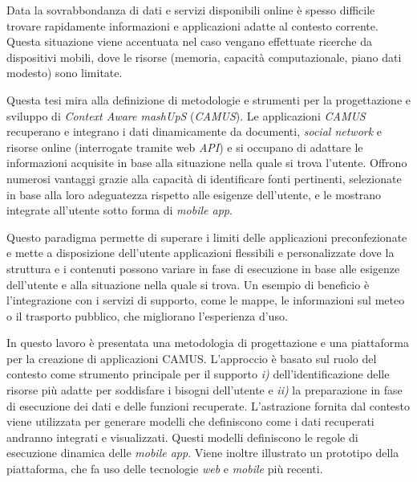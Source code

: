 Data la sovrabbondanza di dati e servizi disponibili online è spesso difficile trovare rapidamente informazioni e applicazioni adatte al contesto corrente. Questa situazione viene accentuata nel caso vengano effettuate ricerche da dispositivi mobili, dove le risorse (memoria, capacità computazionale, piano dati modesto) sono limitate.

Questa tesi mira alla definizione di metodologie e strumenti per la progettazione e sviluppo di \emph{Context Aware mashUpS} (\emph{CAMUS}). Le applicazioni \emph{CAMUS} recuperano e integrano i dati dinamicamente da documenti, \emph{social network} e risorse online (interrogate tramite web \emph{API}) e si occupano di adattare le informazioni acquisite in base alla situazione nella quale si trova l'utente. Offrono numerosi vantaggi grazie alla capacità di identificare fonti pertinenti, selezionate in base alla loro adeguatezza rispetto alle esigenze dell'utente, e le mostrano integrate all'utente sotto forma di \emph{mobile app}.

Questo paradigma permette di superare i limiti delle applicazioni preconfezionate e mette a disposizione dell'utente applicazioni flessibili e personalizzate dove la struttura e i contenuti possono variare in fase di esecuzione in base alle esigenze dell'utente e alla situazione nella quale si trova. Un esempio di beneficio è l'integrazione con i servizi di supporto, come le mappe, le informazioni sul meteo o il trasporto pubblico, che migliorano l'esperienza d'uso.

In questo lavoro è presentata una metodologia di progettazione e una piattaforma per la creazione di applicazioni CAMUS. L'approccio è basato sul ruolo del contesto come strumento principale per il supporto \emph{i)} dell'identificazione delle risorse più adatte per soddisfare i bisogni dell'utente e \emph{ii)} la preparazione in fase di esecuzione dei dati e delle funzioni recuperate. L'astrazione fornita dal contesto viene utilizzata per generare modelli che definiscono come i dati recuperati andranno integrati e visualizzati. Questi modelli definiscono le regole di esecuzione dinamica delle \emph{mobile app}. Viene inoltre illustrato un prototipo della piattaforma, che fa uso delle tecnologie \emph{web} e \emph{mobile} più recenti.